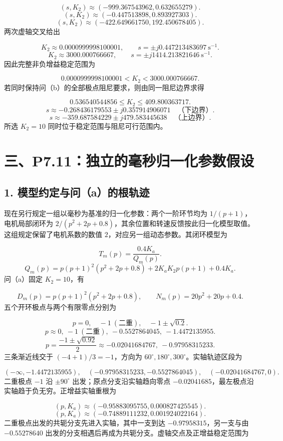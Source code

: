 \documentclass[UTF8,a4paper,11pt]{ctexart}
\begin{document}
\[(s,K_2)\approx(-999.367543962,0.632655279).\]
\[(s,K_2)\approx(-0.447513898,0.893927303).\]
\[(s,K_2)\approx(-422.649661750,192.450678405).\]
两次虚轴交叉给出

\[K_2\approx0.0000999998100001,\qquad s=\pm j0.447213483697\ \mathrm{s}^{-1}.\]
\[K_2\approx3000.000766667,\qquad s=\pm j1414.213821646\ \mathrm{s}^{-1}.\]
因此完整非负增益稳定范围为

\[0.0000999998100001<K_2<3000.000766667.\]
若同时保持问（b）的全部极点阻尼要求，则由同一阻尼边界求得

\[0.536540544856\le K_2\le409.800363717.\]
\[s\approx-0.268436179553\pm j0.357914906071\quad\text{（下边界）}.\]
\[s\approx-359.687584229\pm j479.583445638\quad\text{（上边界）}.\]
所选 $K_2=10$ 同时位于稳定范围与阻尼可行范围内。

\section*{三、P7.11：独立的毫秒归一化参数假设}
\subsection*{1. 模型约定与问（a）的根轨迹}
现在另行规定一组以毫秒为基准的归一化参数：两个一阶环节均为 $1/(p+1)$，电机局部闭环为 $2/(p^2+2p+0.8)$，其余位置和转速反馈按此归一化模型取值。这组规定保留了电机系数的数值 $2$，对应另一组动态参数。其闭环模型为

\[T_m(p)=\frac{0.4K_a}{Q_m(p)}.\]
\[Q_m(p)=p(p+1)^2(p^2+2p+0.8)+2K_aK_2p(p+1)+0.4K_a.\]
问（a）固定 $K_2=10$，有

\[D_m(p)=p(p+1)^2(p^2+2p+0.8),\qquad N_m(p)=20p^2+20p+0.4.\]
五个开环极点与两个有限零点分别为

\[p=0,\quad-1\ (\text{二重}),\quad-1\pm\sqrt{0.2}.\]
\[p\approx0,\ -1\ (\text{二重}),\ -0.5527864045,\ -1.4472135955.\]
\[p=\frac{-1\pm\sqrt{0.92}}2\approx-0.02041684767,\ -0.97958315233.\]
三条渐近线交于 $(-4+1)/3=-1$，方向为 $60^\circ,180^\circ,300^\circ$。实轴轨迹区段为

\[(-\infty,-1.4472135955),\quad(-0.97958315233,-0.5527864045),\quad(-0.02041684767,0).\]
二重极点 $-1$ 沿 $\pm90^\circ$ 出发；原点分支沿实轴趋向零点 $-0.02041685$，最左极点沿实轴趋于负无穷。正增益实轴重根为

\[(p,K_a)\approx(-0.95883095755,0.000827425545).\]
\[(p,K_a)\approx(-0.74889111232,0.001924022164).\]
二重极点出发的共轭分支先进入实轴，其中一支到达 $-0.97958315$，另一支与由 $-0.55278640$ 出发的分支相遇后再成为共轭分支。虚轴交点及正增益稳定范围为
\end{document}
